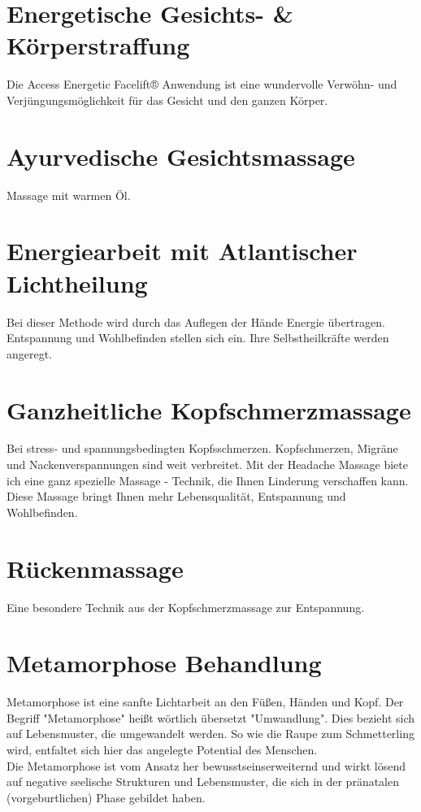\documentclass[10pt,foldmark,notumble]{leaflet}
\begin{document}
\vfill
\section{Energetische Gesichts- \& Körperstraffung}
Die Access Energetic Facelift® Anwendung ist eine wundervolle Verwöhn- und Verjüngungsmöglichkeit für das Gesicht und den ganzen Körper.
\section{Ayurvedische Gesichtsmassage}
Massage mit warmen Öl.
\section{Energiearbeit mit Atlantischer Lichtheilung}
Bei dieser Methode wird durch das Auflegen der Hände Energie übertragen. Entspannung und Wohlbefinden stellen sich ein. Ihre Selbstheilkräfte werden angeregt. 
\section{Ganzheitliche Kopfschmerzmassage}
Bei stress- und spannungsbedingten Kopfsschmerzen. 
Kopfschmerzen, Migräne und Nackenverspannungen sind weit verbreitet. Mit der Headache Massage biete ich eine ganz spezielle Massage - Technik, die Ihnen Linderung verschaffen kann. Diese Massage bringt Ihnen mehr Lebensqualität, Entspannung und Wohlbefinden. 
\vfill


\newpage

\vfill
\section{Rückenmassage}
Eine besondere Technik aus der Kopfschmerzmassage zur Entspannung. 
\vfill
\section{Metamorphose Behandlung}
Metamorphose ist eine sanfte Lichtarbeit an den Füßen, Händen und Kopf. Der Begriff "Metamorphose" heißt wörtlich übersetzt "Umwandlung". Dies bezieht sich auf Lebensmuster, die umgewandelt werden. So wie die Raupe zum Schmetterling wird, entfaltet sich hier das angelegte Potential des Menschen.
\\
Die Metamorphose ist vom Ansatz her bewusstseins\-erweiternd und wirkt lösend auf negative seelische Strukturen und Lebensmuster, die sich in der pränatalen (vorgeburtlichen) Phase gebildet haben.
\vfill
\end{document}
